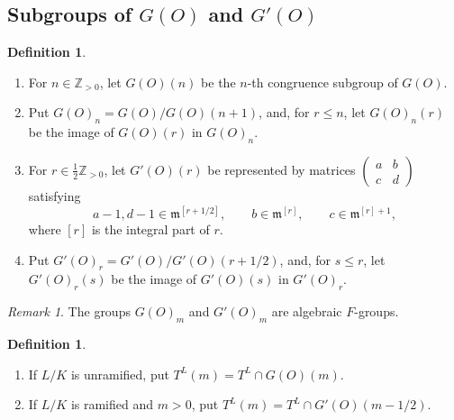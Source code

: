 \documentclass[11pt,a4paper,twoside]{amsart}
\theoremstyle{definition}
\newtheorem{definition}[theorem]{Definition}
\theoremstyle{remark}
\newtheorem{remark}[theorem]{Remark}
\newcommand{\ZZ}{\mathbb Z}
\newcommand{\fm}{\mathfrak m}
\begin{document}
\subsection{Subgroups of $G(O)$ and $G'(O)$}
\begin{definition}\label{G-prime-filtration}
\begin{enumerate}
\item For $n\in\ZZ_{>0}$, let $G(O)(n)$ be the $n$-th congruence subgroup of $G(O)$.
\item Put $G(O)_n=G(O)/G(O)(n+1)$, and, for $r\leq n$, let $G(O)_n(r)$ be the image of $G(O)(r)$ in $G(O)_n$.
\item For $r\in\frac12\ZZ_{>0}$, let $G'(O)(r)$ be represented by matrices $\begin{pmatrix}a&b\\c&d\end{pmatrix}$ satisfying
$$
a-1,d-1\in\fm^{[r+1/2]},\qquad b\in\fm^{[r]},\qquad c\in\fm^{[r]+1},
$$
where $[r]$ is the integral part of $r$.
\item Put $G'(O)_r=G'(O)/G'(O)(r+1/2)$, and, for $s\leq r$, let $G'(O)_r(s)$ be the image of $G'(O)(s)$ in $G'(O)_r$.
\end{enumerate}
\end{definition}
\begin{remark}
The groups $G(O)_m$ and $G'(O)_m$ are algebraic $F$-groups.
\end{remark}
\begin{definition}
\begin{enumerate}
\item If $L/K$ is unramified, put $T^L(m)=T^L\cap G(O)(m)$.
\item If $L/K$ is ramified and $m>0$, put $T^L(m)=T^L\cap G'(O)(m-1/2)$.
\end{enumerate}
\end{definition}
\end{document}
